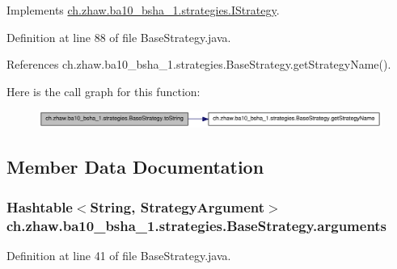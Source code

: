 Implements \hyperlink{interfacech_1_1zhaw_1_1ba10__bsha__1_1_1strategies_1_1IStrategy_a2b109250e12270545e1c342c9d136bcd}{ch.zhaw.ba10\_\-bsha\_\-1.strategies.IStrategy}.

Definition at line 88 of file BaseStrategy.java.

References ch.zhaw.ba10\_\-bsha\_\-1.strategies.BaseStrategy.getStrategyName().

Here is the call graph for this function:\nopagebreak
\begin{figure}[H]
\begin{center}
\leavevmode
\includegraphics[width=319pt]{classch_1_1zhaw_1_1ba10__bsha__1_1_1strategies_1_1BaseStrategy_adfb24fbd69261e8567269c5d59365e46_cgraph}
\end{center}
\end{figure}


\subsection{Member Data Documentation}
\hypertarget{classch_1_1zhaw_1_1ba10__bsha__1_1_1strategies_1_1BaseStrategy_ac15d972a209d299069ce7d7940e9322e}{
\subsubsection[{arguments}]{\setlength{\rightskip}{0pt plus 5cm}Hashtable$<$String, {\bf StrategyArgument}$>$ {\bf ch.zhaw.ba10\_\-bsha\_\-1.strategies.BaseStrategy.arguments}}}
\label{classch_1_1zhaw_1_1ba10__bsha__1_1_1strategies_1_1BaseStrategy_ac15d972a209d299069ce7d7940e9322e}


Definition at line 41 of file BaseStrategy.java.

